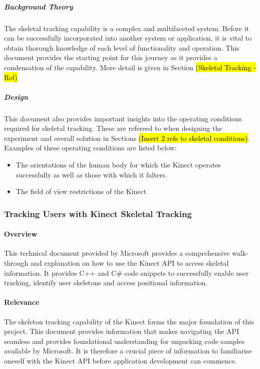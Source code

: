 \subparagraph{Background Theory}
The skeletal tracking capability is a complex and multifaceted system. Before it can be successfully incorporated into another system or application, it is vital to obtain thorough knowledge of each level of functionality and operation. This document provides the starting point for this journey as it provides a condensation of the capability. More detail is given in Section \hl{(Skeletal Tracking - Ref)}

\subparagraph{Design}
This document also provides important insights into the operating conditions required for skeletal tracking. These are refereed to when designing the experiment and overall solution in Sections \hl{(Insert 2 refs to skeletal conditions)}. Examples of these operating conditions are listed below:
\begin{itemize}
	\item The orientations of the human body for which the Kinect operates successfully as well as those with which it falters.  
	\item The field of view restrictions of the Kinect
\end{itemize}

\subsubsection{Tracking Users with Kinect Skeletal Tracking \cite{msdnTrackUserSkel2017}} \label{litTrackSkelUsers}

\paragraph{Overview}
This technical document provided by Microsoft provides a comprehensive walk-through and explanation on how to use the Kinect API to access skeletal information. It provides C++ and C\# code snippets to successfully enable user tracking, identify user skeletons and access positional information.

\paragraph{Relevance}
The skeleton tracking capability of the Kinect forms the major foundation of this project. This document provides information that makes navigating the API seamless and provides foundational understanding for unpacking code samples available by Microsoft. It is therefore a crucial piece of information to familiarise oneself with the Kinect API before application development can commence. 

